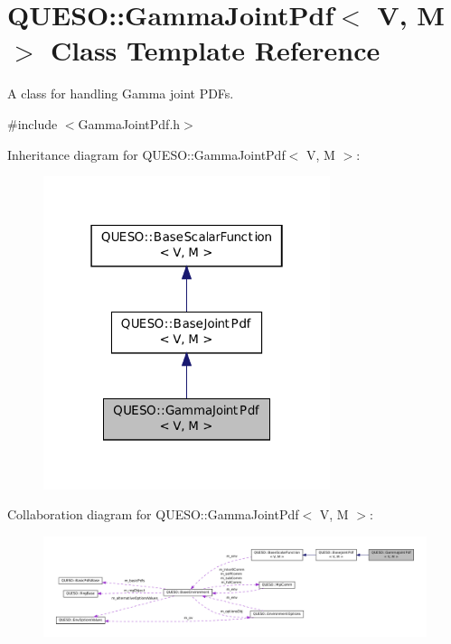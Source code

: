 \hypertarget{class_q_u_e_s_o_1_1_gamma_joint_pdf}{\section{Q\-U\-E\-S\-O\-:\-:Gamma\-Joint\-Pdf$<$ V, M $>$ Class Template Reference}
\label{class_q_u_e_s_o_1_1_gamma_joint_pdf}
}


A class for handling Gamma joint P\-D\-Fs.  




{\ttfamily \#include $<$Gamma\-Joint\-Pdf.\-h$>$}



Inheritance diagram for Q\-U\-E\-S\-O\-:\-:Gamma\-Joint\-Pdf$<$ V, M $>$\-:
\nopagebreak
\begin{figure}[H]
\begin{center}
\leavevmode
\includegraphics[width=238pt]{class_q_u_e_s_o_1_1_gamma_joint_pdf__inherit__graph}
\end{center}
\end{figure}


Collaboration diagram for Q\-U\-E\-S\-O\-:\-:Gamma\-Joint\-Pdf$<$ V, M $>$\-:
\nopagebreak
\begin{figure}[H]
\begin{center}
\leavevmode
\includegraphics[width=350pt]{class_q_u_e_s_o_1_1_gamma_joint_pdf__coll__graph}
\end{center}
\end{figure}
